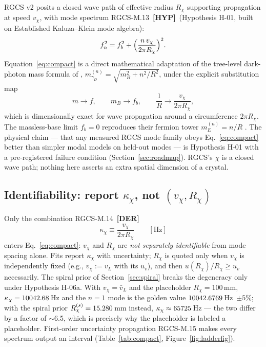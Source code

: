 \documentclass[10pt,letterpaper]{article}
\newcommand{\cltag}[2]{\textcolor{#1}{{\fontspec{TeX Gyre Heros}\scriptsize\bfseries[#2]}}}
\newcommand{\DER}{\cltag{dercol}{DER}}   %
\newcommand{\HYP}{\cltag{hypcol}{HYP}}   %
\newcommand{\eqid}[1]{\textcolor{inkgray}{\scriptsize\textsf{#1}}}
\newcommand{\Rchi}{R_{\chi}}
\newcommand{\vchi}{v_{\chi}}
\newcommand{\kchi}{\kappa_{\chi}}
\newcommand{\fb}{f_{b}}
\newcommand{\vL}{v_{L}}
\newcommand{\vbarL}{\bar{v}_{L}}
\newcommand{\uv}{u_{v}}
\begin{document}
RGCS v2 posits a closed wave path of effective radius $\Rchi$ supporting
propagation at speed $\vchi$, with mode spectrum \eqid{RGCS-M.13}\ \HYP\
(Hypothesis H-01, built on Established Kaluza--Klein mode algebra):
\begin{equation}
f_n^{2} = \fb^{2} + \Bigl(\frac{n\,\vchi}{2\pi \Rchi}\Bigr)^{2}.
\label{eq:compact}
\end{equation}
Equation~\eqref{eq:compact} is a direct mathematical adaptation of the
tree-level dark-photon mass formula of \citet[Eqs.~(9)--(10)]{leetsai2026},
$m_{\gamma_D}^{(n)} = \sqrt{m_B^2 + n^2/R^2}$, under the explicit
substitution map
\begin{equation*}
m \longrightarrow f,\qquad
m_B \longrightarrow \fb,\qquad
\frac{1}{R} \longrightarrow \frac{\vchi}{2\pi \Rchi},
\end{equation*}
which is dimensionally exact for wave propagation around a circumference
$2\pi\Rchi$. The massless-base limit $\fb = 0$ reproduces their fermion
tower $m_E^{(n)} = n/R$ \citep[Eq.~(9)]{leetsai2026}. The physical claim —
that any measured RGCS mode family obeys Eq.~\eqref{eq:compact} better than
simpler modal models on held-out modes — is Hypothesis H-01 with a
pre-registered failure condition (Section~\ref{sec:roadmap}). RGCS's
$\chi$ is a closed wave path; nothing here asserts an extra spatial
dimension of a crystal.

\subsection{Identifiability: report \texorpdfstring{$\kchi$}{kappa}, not \texorpdfstring{$(\vchi, \Rchi)$}{(v,R)}}

Only the combination \eqid{RGCS-M.14}\ \DER
\begin{equation}
\kchi \equiv \frac{\vchi}{2\pi \Rchi}\qquad[\text{Hz}]
\end{equation}
enters Eq.~\eqref{eq:compact}: $\vchi$ and $\Rchi$ are \emph{not separately
identifiable} from mode spacing alone. Fits report $\kchi$ with
uncertainty; $\Rchi$ is quoted only when $\vchi$ is independently fixed
(e.g., $\vchi := \vL$ with its $\uv$), and then $u(\Rchi)/\Rchi \ge \uv$
necessarily. The spiral prior of Section~\ref{sec:spiral} breaks the
degeneracy only under Hypothesis H-06a. With $\vchi = \vbarL$ and the
placeholder $\Rchi = 100$\,mm, $\kchi = \gvKappaChi$\,Hz and the $n = 1$
mode is the golden value $10042.6769$\,Hz~$\pm 5\%$; with the spiral prior
$R_\chi^{(s)} = 15.280$\,mm instead, $\kchi \approx
\gvKappaPrior$\,Hz — the two differ by a factor of $\sim$6.5, which is
precisely why the placeholder is labeled a placeholder. First-order
uncertainty propagation \eqid{RGCS-M.15} makes every spectrum output an
interval (Table~\ref{tab:compact}, Figure~\ref{fig:ladderfig}).
\end{document}
